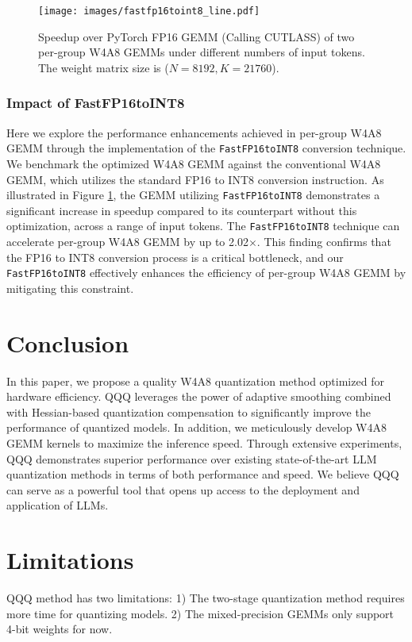 \begin{figure}[ht]
\centering
\texttt{[image: images/fastfp16toint8\_line.pdf]}
\caption{Speedup over PyTorch FP16 GEMM (Calling CUTLASS) of two per-group W4A8 GEMMs under different numbers of input tokens. The weight matrix size is ($N=8192, K=21760$).}
\label{fig:fig9}
\vspace{-0.15in}
\end{figure}
\subsubsection{Impact of FastFP16toINT8}
Here we explore the performance enhancements achieved in per-group W4A8 GEMM through the implementation of the \texttt{FastFP16toINT8} conversion technique. We benchmark the optimized W4A8 GEMM against the conventional W4A8 GEMM, which utilizes the standard FP16 to INT8 conversion instruction. As illustrated in Figure \ref{fig:fig9}, the GEMM utilizing \texttt{FastFP16toINT8} demonstrates a significant increase in speedup compared to its counterpart without this optimization, across a range of input tokens. The \texttt{FastFP16toINT8} technique can accelerate per-group W4A8 GEMM by up to 2.02$\times$. This finding confirms that the FP16 to INT8 conversion process is a critical bottleneck, and our \texttt{FastFP16toINT8} effectively enhances the efficiency of per-group W4A8 GEMM by mitigating this constraint.

\section{Conclusion}\label{section:sec6}
In this paper, we propose a quality W4A8 quantization method optimized for hardware efficiency. QQQ leverages the power of adaptive smoothing combined with Hessian-based quantization compensation to significantly improve the performance of quantized models. In addition, we meticulously develop W4A8 GEMM kernels to maximize the inference speed. Through extensive experiments, QQQ demonstrates superior performance over existing state-of-the-art LLM quantization methods in terms of both performance and speed. We believe QQQ can serve as a powerful tool that opens up access to the deployment and application of LLMs.

\section*{Limitations}
QQQ method has two limitations: 1) The two-stage quantization method requires more time for quantizing models. 2) The mixed-precision GEMMs only support 4-bit weights for now.

